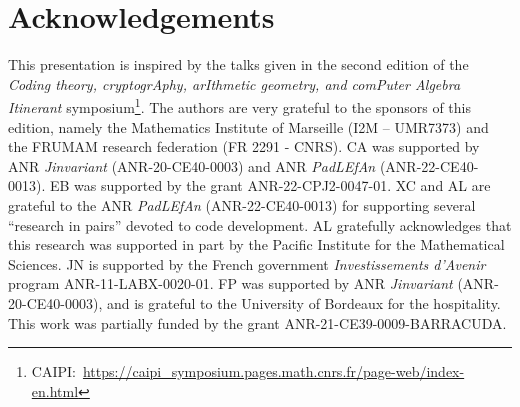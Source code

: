 \documentclass[11pt]{article}
\theoremstyle{definition}
\begin{document}
    \section*{Acknowledgements}

    This presentation is inspired by the talks given in the second edition of the \textit{Coding theory, cryptogrAphy, arIthmetic geometry, and comPuter Algebra Itinerant} symposium\footnote{CAIPI:\, \url{https://caipi_symposium.pages.math.cnrs.fr/page-web/index-en.html}}.
    The authors are very grateful to the sponsors of this edition, namely the Mathematics Institute of Marseille (I2M – UMR7373) and the FRUMAM research federation (FR 2291 - CNRS).
    CA was supported by ANR {\it Jinvariant} (ANR-20-CE40-0003) and ANR \emph{PadLEfAn} (ANR-22-CE40-0013).
    EB was supported by the grant ANR-22-CPJ2-0047-01.
    XC and AL are grateful to the ANR \emph{PadLEfAn} (ANR-22-CE40-0013) for supporting several ``research in pairs'' devoted to code development.
    AL gratefully acknowledges that this research was supported in part by the Pacific Institute for the Mathematical Sciences.
    JN is supported by the French government \textit{Investissements d’Avenir} program ANR-11-LABX-0020-01.
    FP was supported by ANR {\it Jinvariant} (ANR-20-CE40-0003), and is grateful to the University of Bordeaux for the hospitality.
    This work was partially funded by the grant ANR-21-CE39-0009-BARRACUDA. 

	
	
	
\end{document}
